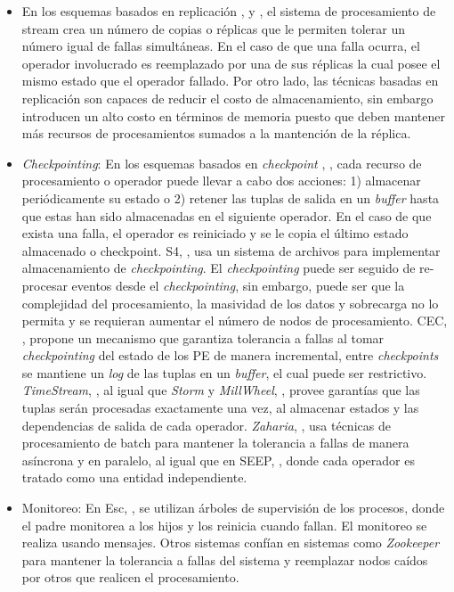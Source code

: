 \begin{itemize}
\item En los esquemas basados en replicación \cite{HwangTolerancia}, \cite{ShahTolerance} y \cite{BalazinskaTolerance}, el sistema de procesamiento de stream crea un número de copias o réplicas que le permiten tolerar un número igual de fallas simultáneas. En el caso de que una falla ocurra, el operador involucrado es reemplazado por una de sus réplicas la cual posee el mismo estado que el operador fallado. Por otro lado, las técnicas basadas en replicación son capaces de reducir el costo de almacenamiento, sin embargo introducen un alto costo en términos de memoria puesto que deben mantener más recursos de procesamientos sumados a la mantención de la réplica.
\item \textit{Checkpointing}: En los esquemas basados en \textit{checkpoint} \cite{HwangTolerancia}, \cite{WangTolerance1}, cada recurso de procesamiento o operador puede llevar a cabo dos acciones: 1) almacenar periódicamente su estado o 2) retener las tuplas de salida en un \textit{buffer} hasta que estas han sido almacenadas en el siguiente operador. En el caso de que exista una falla, el operador es reiniciado y se le copia el último estado almacenado o checkpoint. S4, \cite{NeumeyerS4}, usa un sistema de archivos para implementar almacenamiento de \textit{checkpointing}. El \textit{checkpointing} puede ser seguido de re-procesar eventos desde el \textit{checkpointing}, sin embargo, puede ser que la complejidad del procesamiento, la masividad de los datos y sobrecarga no lo permita y se requieran aumentar el número de nodos de procesamiento. CEC, \cite{SebepouCEC}, propone un mecanismo que garantiza tolerancia a fallas al tomar \textit{checkpointing} del estado de los PE de manera incremental, entre \textit{checkpoints} se mantiene un \textit{log} de las tuplas en un \textit{buffer}, el cual puede ser restrictivo. \textit{TimeStream}, \cite{QianTimeStream}, al igual que \textit{Storm} y \textit{MillWheel}, \cite{AkidauMillWheel}, provee garantías que las tuplas serán procesadas exactamente una vez, al almacenar estados y las dependencias de salida de cada operador. \textit{Zaharia}, \cite{ZahariaDiscretized}, usa técnicas de procesamiento de batch para mantener la tolerancia a fallas de manera asíncrona y en paralelo, al igual que en SEEP, \cite{CastroFernandezISFT}, donde cada operador es tratado como una entidad independiente.
\item Monitoreo: En Esc, \cite{SatzgerESC}, se utilizan árboles de supervisión de los procesos, donde el padre monitorea a los hijos y los reinicia cuando fallan. El monitoreo se realiza usando mensajes. Otros sistemas confían en sistemas como \textit{Zookeeper} para mantener la tolerancia a fallas del sistema y reemplazar nodos caídos por otros que realicen el procesamiento.
\end{itemize}

